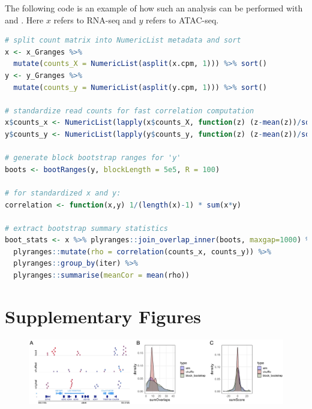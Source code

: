 \documentclass{article}
\begin{document}
The following code is an example of how such an analysis can be
performed with \bootranges and \plyranges. Here $x$ refers to RNA-seq and $y$ refers to ATAC-seq.

\begin{lstlisting}[language=R]
# split count matrix into NumericList metadata and sort
x <- x_Granges %>%
  mutate(counts_X = NumericList(asplit(x.cpm, 1))) %>% sort()
y <- y_Granges %>%
  mutate(counts_y = NumericList(asplit(y.cpm, 1))) %>% sort()

# standardize read counts for fast correlation computation
x$counts_x <- NumericList(lapply(x$counts_X, function(z) (z-mean(z))/sd(z)))
y$counts_y <- NumericList(lapply(y$counts_y, function(z) (z-mean(z))/sd(z)))

# generate block bootstrap ranges for 'y'
boots <- bootRanges(y, blockLength = 5e5, R = 100)

# for standardized x and y:
correlation <- function(x,y) 1/(length(x)-1) * sum(x*y)

# extract bootstrap summary statistics
boot_stats <- x %>% plyranges::join_overlap_inner(boots, maxgap=1000) %>%
  plyranges::mutate(rho = correlation(counts_x, counts_y)) %>%
  plyranges::group_by(iter) %>%
  plyranges::summarise(meanCor = mean(rho)) 
\end{lstlisting} 
 
\newpage

\section{Supplementary Figures}

\begin{figure}[htbp]
\centering
\includegraphics[scale=0.2]{Figures/simulation.jpg}
\caption{
}
\label{fig:simulation}
\end{figure}
\end{document}
